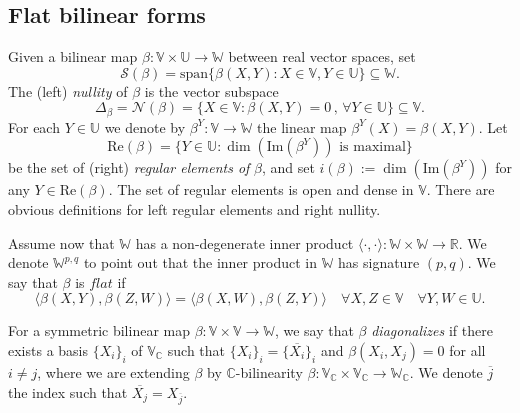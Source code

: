 \documentclass{article}
\theoremstyle{remark}
\begin{document}
\subsection{Flat bilinear forms}
Given a bilinear map $\beta:\mathbb{V}\times \mathbb{U}\rightarrow \mathbb{W}$ between real vector spaces, set
\begin{equation*}
    \mathcal{S}(\beta)=\text{span}\{\beta(X,Y):X\in \mathbb{V}, Y\in \mathbb{U}\}\subseteq \mathbb{W}.
\end{equation*}
The (left) \emph{nullity} of $\beta$ is the vector subspace
\begin{equation*}
    \Delta_\beta=\mathcal{N}(\beta)=\{X\in \mathbb{V}:\beta(X,Y)=0\, ,\,\forall Y\in \mathbb{U}\}\subseteq \mathbb{V}.
\end{equation*}
For each $Y\in \mathbb{U}$ we denote by $\beta^Y:\mathbb{V}\rightarrow \mathbb{W}$ the linear map $\beta^Y(X)=\beta(X,Y)$. Let
\begin{equation*}
    \text{Re}(\beta)=\{Y\in \mathbb{U}:\dim(\text{Im}(\beta^Y))\text{ is maximal}\}
\end{equation*}
be the set of (right) \emph{regular elements of} $\beta$, and set $i(\beta):=\dim(\text{Im}(\beta^Y))$ for any $Y\in\text{Re}(\beta)$. The set of regular elements is open and dense in $\mathbb{V}$. There are obvious definitions for left regular elements and right nullity.

Assume now that $\mathbb{W}$ has a non-degenerate inner product $\langle\cdot,\cdot\rangle:\mathbb{W}\times \mathbb{W}\rightarrow\mathbb{R}$. We denote $\mathbb{W}^{p,q}$ to point out that the inner product in $\mathbb{W}$ has signature $(p,q)$. We say that $\beta$ is $\mathit{flat}$ if
\begin{equation*}
    \langle\beta(X,Y),\beta(Z,W)\rangle=\langle\beta(X,W),\beta(Z,Y)\rangle\quad\forall X,Z\in \mathbb{V}\quad \forall Y,W\in \mathbb{U}.
\end{equation*}

For a symmetric bilinear map $\beta:\mathbb{V}\times\mathbb{V}\rightarrow\mathbb{W}$, we say that $\beta$ {\it diagonalizes} if there exists a basis $\{X_i\}_{i}$ of $\mathbb{V}_\mathbb{C}$ such that $\{X_i\}_{i}=\{\overline{X_i}\}_{i}$ and $\beta(X_i,X_j)=0$ for all $i\neq j$, where we are extending $\beta$ by $\mathbb{C}$-bilinearity $\beta:\mathbb{V}_\mathbb{C}\times \mathbb{V}_\mathbb{C}\rightarrow \mathbb{W}_\mathbb{C}$. We denote $\overline{j}$ the index such that $\overline{X_j}=X_{\overline{j}}$. 
\end{document}
